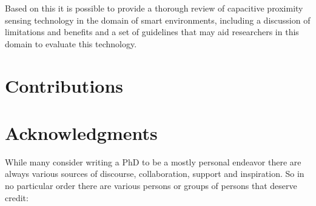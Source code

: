 Based on this it is possible to provide a thorough review of capacitive proximity sensing technology in the domain of smart environments, including a discussion of limitations and benefits and a set of guidelines that may aid researchers in this domain to evaluate this technology.
\section{Contributions}

\section{Acknowledgments}
While many consider writing a PhD to be a mostly personal endeavor there are always various sources of discourse, collaboration, support and inspiration. 
So in no particular order there are various persons or groups of persons that deserve credit: 